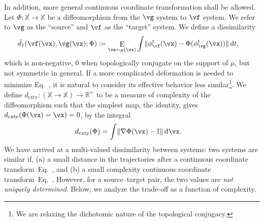 \documentclass{article}
\theoremstyle{definition} \newtheorem{definition}{Definition}  \newtheorem{example}{Example}
\theoremstyle{remark} \newtheorem{remark}{Remark}
\renewcommand{\eqref}{Eq.~\originaleqref}
\newcounter{ct}
\DeclarePairedDelimiter{\norm}{\lVert}{\rVert}
\DeclareMathOperator*{\E}{\rm E} %
\newcommand{\dm}[1]{\ensuremath{\mathrm{d}{#1}}} %
\newcommand{\field}[1]{\ensuremath{\mathbb{#1}}}
\newcommand{\reals}{\field{R}}
\newcommand{\identity}{\ensuremath{\mathbb{I}}}
\newcommand{\posReals}{\reals^{+}}
\newcommand{\inputSpace}{\mathbb{X}}
\newcommand{\dcomplexity}{\ensuremath{d_\text{cxty}}}
\newcommand{\initDist}{\mu} %
\newcommand{\homeo}{\Phi} %
\begin{document}
In addition, more general continuous coordinate transformation shall be allowed.
Let $\homeo: \inputSpace \to \inputSpace$ be a diffeomorphism from the $\vg$ system to $\vf$ system.
We refer to $\vg$ as the ``source'' and $\vf$ as the ``target'' system.
We define a dissimilarity
\begin{align}\label{eq:ed1}
    \bar{d}_1(\vf(\vx), \vg(\vx); \homeo)
	&\coloneq 
	    \E_{\vx \sim \initDist(\vx)}
		\int
		    \norm{\phi_{\vf}^t(\vx) - \homeo(\phi_{\vg}^t(\vx))}
		\,\dm{t},
\end{align}
which is non-negative, $0$ when topologically conjugate on the support of $\mu$, but not symmetric in general.
If a more complicated deformation is needed to minimize \eqref{eq:ed1}, it is natural to consider its effective behavior less similar\footnote{
We are relaxing the dichotomic nature of the topological conjugacy.
}.
We define  $\dcomplexity: (\inputSpace \to \inputSpace) \to \posReals$ to be a measure of complexity of the diffeomorphism such that the simplest map, the identity, gives $\dcomplexity(\homeo(\vx) = \vx) = 0$, by the integral
\begin{align}\label{eq:dcomplexity}
    \dcomplexity(\homeo) &=
    \int
	 \norm{\nabla\homeo(\vx) - \identity} %
    \,\dm{\vx}.
\end{align}
%
We have arrived at a multi-valued dissimilarity between systems:
two systems are similar if,
(a) a small distance in the trajectories after a continuous coordinate transform~\eqref{eq:ed1},
and (b) a small complexity continuous coordinate transform~\eqref{eq:dcomplexity}.
However, for a source--target pair, the two values are \emph{not uniquely determined}.
Below, we analyze the trade-off as a function of complexity.
\end{document}
